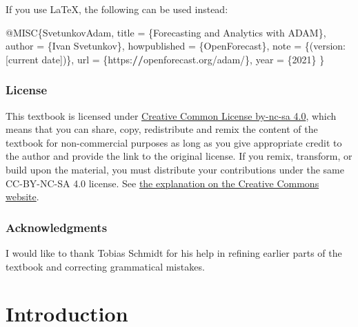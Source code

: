 \documentclass[
]{book}
\newenvironment{Shaded}{\begin{snugshade}}{\end{snugshade}}
\newcommand{\DecValTok}[1]{\textcolor[rgb]{0.00,0.00,0.81}{#1}}
\newcommand{\ErrorTok}[1]{\textcolor[rgb]{0.64,0.00,0.00}{\textbf{#1}}}
\newcommand{\NormalTok}[1]{#1}
\newcommand{\OtherTok}[1]{\textcolor[rgb]{0.56,0.35,0.01}{#1}}
\newcommand{\SpecialCharTok}[1]{\textcolor[rgb]{0.00,0.00,0.00}{#1}}
\theoremstyle{definition}
\theoremstyle{definition}
\theoremstyle{definition}
\theoremstyle{definition}
\theoremstyle{remark}
\begin{document}
If you use LaTeX, the following can be used instead:

\begin{Shaded}
\begin{Highlighting}[]
\SpecialCharTok{@}\NormalTok{MISC\{SvetunkovAdam,}
\NormalTok{    title }\OtherTok{=}\NormalTok{ \{Forecasting and Analytics with ADAM\},}
\NormalTok{    author }\OtherTok{=}\NormalTok{ \{Ivan Svetunkov\},}
\NormalTok{    howpublished }\OtherTok{=}\NormalTok{ \{OpenForecast\},}
\NormalTok{    note }\OtherTok{=}\NormalTok{ \{(version}\SpecialCharTok{:}\NormalTok{ [current date])\},}
\NormalTok{    url }\OtherTok{=}\NormalTok{ \{https}\SpecialCharTok{:}\ErrorTok{//}\NormalTok{openforecast.org}\SpecialCharTok{/}\NormalTok{adam}\SpecialCharTok{/}\NormalTok{\},}
\NormalTok{    year }\OtherTok{=}\NormalTok{ \{}\DecValTok{2021}\NormalTok{\}}
\NormalTok{\}}
\end{Highlighting}
\end{Shaded}

\hypertarget{license}{%
\subsection*{License}\label{license}}

This textbook is licensed under \href{https://creativecommons.org/licenses/by-nc-sa/4.0/}{Creative Common License by-nc-sa 4.0}, which means that you can share, copy, redistribute and remix the content of the textbook for non-commercial purposes as long as you give appropriate credit to the author and provide the link to the original license. If you remix, transform, or build upon the material, you must distribute your contributions under the same CC-BY-NC-SA 4.0 license. See \href{https://creativecommons.org/licenses/by-nc-sa/4.0/}{the explanation on the Creative Commons website}.

\hypertarget{acknowledgments}{%
\subsection*{Acknowledgments}\label{acknowledgments}}

I would like to thank Tobias Schmidt for his help in refining earlier parts of the textbook and correcting grammatical mistakes.

\hypertarget{intro}{%
\chapter{Introduction}\label{intro}}
\end{document}
